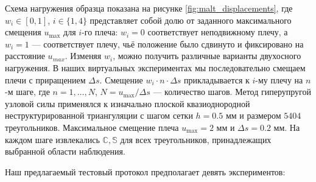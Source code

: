 Схема нагружения образца показана на рисунке \ref{fig:malt_displacements}, где $w_i \in [0,1]$, $i \in \{1,4\}$
представляет собой долю от заданного максимального смещения $u_{\max}$ для $i$-го плеча: $w_i = 0$ 
соответствует неподвижному плечу, а $w_i = 1$ — соответствует плечу, чьё положение было сдвинуто и фиксировано на расстояние $u_{max}$. 
Изменяя $w_i$, можно получить различные варианты двухосного нагружения. 
В наших виртуальных экспериментах мы последовательно
смещаем плечи с приращением $\Delta s$. 
Смещение $w_i \cdot n \cdot \Delta s$ прикладывается к $i$-му плечу на $n$-м шаге, где $n = 1, \ldots, N$, 
$N = u_{\max}/\Delta s$ — количество шагов. 
Метод гиперупругой узловой силы применялся к изначально плоской квазиоднородной неструктурированной триангуляции с шагом сетки $h=0.5$ мм и размером $5 404$ треугольников. Максимальное смещение плеча
$u_{\max} = 2$ мм и $\Delta s = 0.2$ мм.
На каждом шаге извлекались $\mathbb{C}, \mathbb{S}$ для всех треугольников, принадлежащих выбранной области наблюдения. 

 
 
Наш предлагаемый тестовый протокол предполагает девять экспериментов:

